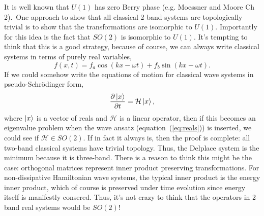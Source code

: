 \documentclass[11pt]{article}
\begin{document}
It is well known that $U(1)$ has zero Berry phase (e.g. Moessner and Moore Ch 2).\
One approach to show that all classical 2 band systems are topologically trivial is to show that the transformations are isomorphic to $U(1)$.
Importantly for this idea is the fact that $SO(2)$ is isomorphic to $U(1)$.
It's tempting to think that this is a good strategy, because of course, we can always write classical systems in terms of purely real variables,
\begin{equation}
  \label{eq:reals}
  f(x,t) = f_a \cos{(k x - \omega t)} + f_b \sin{(k x - \omega t)}.
\end{equation}
If we could somehow write the equations of motion for classical wave systems in pseudo-Schr\"odinger form,
\begin{equation}
  \label{eq:pseudo-schrodinger}
  \frac{\partial \ket{x}}{\partial t} = \mathcal{H} \ket{x},
\end{equation}
where $\ket{x}$ is a vector of reals and $\mathcal{H}$ is a linear operator, then if this becomes an eigenvalue problem when the wave ansatz (equation~(\ref{eq:reals})) is inserted, we could see if $\mathcal{H} \in SO(2)$.
If in fact it always is, then the proof is complete: all two-band classical systems have trivial topology.
Thus, the Delplace system is the minimum because it is three-band.
There is a reason to think this might be the case: orthogonal matrices represent inner product preserving transformations. For non-dissipative Hamiltonian wave systems, the typical inner product is the energy inner product, which of course is preserved under time evolution since energy itself is manifestly consered.
Thus, it's not crazy to think that the operators in 2-band real systems would be $SO(2)$!
\end{document}
